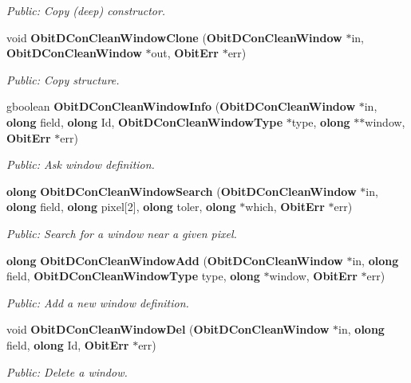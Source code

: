 \begin{CompactItemize}
\begin{CompactList}\small\item\em Public: Copy (deep) constructor. \item\end{CompactList}\item 
void {\bf Obit\-DCon\-Clean\-Window\-Clone} ({\bf Obit\-DCon\-Clean\-Window} $\ast$in, {\bf Obit\-DCon\-Clean\-Window} $\ast$out, {\bf Obit\-Err} $\ast$err)
\begin{CompactList}\small\item\em Public: Copy structure. \item\end{CompactList}\item 
gboolean {\bf Obit\-DCon\-Clean\-Window\-Info} ({\bf Obit\-DCon\-Clean\-Window} $\ast$in, {\bf olong} field, {\bf olong} Id, {\bf Obit\-DCon\-Clean\-Window\-Type} $\ast$type, {\bf olong} $\ast$$\ast$window, {\bf Obit\-Err} $\ast$err)
\begin{CompactList}\small\item\em Public: Ask window definition. \item\end{CompactList}\item 
{\bf olong} {\bf Obit\-DCon\-Clean\-Window\-Search} ({\bf Obit\-DCon\-Clean\-Window} $\ast$in, {\bf olong} field, {\bf olong} pixel[2], {\bf olong} toler, {\bf olong} $\ast$which, {\bf Obit\-Err} $\ast$err)
\begin{CompactList}\small\item\em Public: Search for a window near a given pixel. \item\end{CompactList}\item 
{\bf olong} {\bf Obit\-DCon\-Clean\-Window\-Add} ({\bf Obit\-DCon\-Clean\-Window} $\ast$in, {\bf olong} field, {\bf Obit\-DCon\-Clean\-Window\-Type} type, {\bf olong} $\ast$window, {\bf Obit\-Err} $\ast$err)
\begin{CompactList}\small\item\em Public: Add a new window definition. \item\end{CompactList}\item 
void {\bf Obit\-DCon\-Clean\-Window\-Del} ({\bf Obit\-DCon\-Clean\-Window} $\ast$in, {\bf olong} field, {\bf olong} Id, {\bf Obit\-Err} $\ast$err)
\begin{CompactList}\small\item\em Public: Delete a window. \item\end{CompactList}\item 
$$
\end{CompactItemize}
